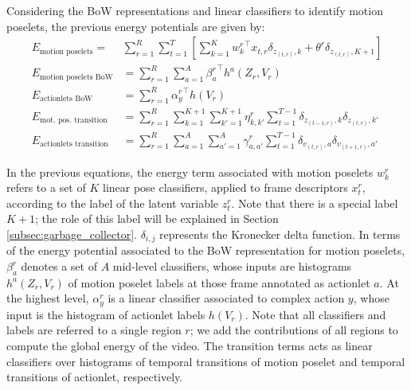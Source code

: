 Considering the BoW representations and linear classifiers to identify motion 
poselets, 
the previous energy potentials are given by:
{\small
\begin{align}
\label{eq:motionposelets}E_{\text{motion poselets}}  =  &\sum_{r=1}^R\sum_{t=1}^T  \left[ \sum_{k=1}^K {w^r_k}^\top 
x_{t,r}\delta_{z_{(t,r)},k} + \theta^r \delta_{z_{(t,r)},K+1}\right] \\
E_{\text{motion poselets BoW}} & = \sum_{r=1}^R \sum_{a=1}^A {\beta^r_{a}}^\top 
h^{a}(Z_r,V_r) \\
\label{eq:actionlets_BoW} E_{\text{actionlets BoW}} &=\sum_{r=1}^R {\alpha^r_{y}}^\top h(V_r)  \\
E_{\text{mot. pos. transition}} & = 
\sum_{r=1}^R\sum_{k=1}^{K+1}\sum_{k'=1}^{K+1} \eta^r_{k,k'} 
\sum_{t=1}^{T-1} \delta_{z_{(t-1,r)},k}\delta_{z_{(t,r)},k'}\\ 
\label{eq:actionletstransition}
E_{\text{actionlets transition}} & =\sum_{r=1}^R\sum_{a=1}^A\sum_{a'=1}^A \gamma^r_{a,a'} 
\sum_{t=1}^{T-1} 
\delta_{v_{(t,r)},a}\delta_{v_{(t+1,r)},a'} 
\end{align}
}

In the previous equations, the energy term associated with motion poselets 
$w^r_k$ refers to a set of $K$ linear pose classifiers, applied to frame 
descriptors $x_t^r$, according to the label of the latent variable $z_t^r$. 
Note that there is a special label $K+1$; the role of this label will be 
explained in Section \ref{subsec:garbage_collector}. $\delta_{i,j}$ represents 
the Kronecker delta function. In terms of the energy potential associated to 
the BoW representation for motion poselets, $\beta_a^r$ denotes a set of $A$ 
mid-level classifiers, whose inputs are histograms $h^a(Z_r,V_r)$ of motion 
poselet labels at those frame annotated as actionlet $a$. At the highest level, 
$\alpha^r_{y}$ is a linear classifier  associated to complex action $y$, whose 
input is the histogram of actionlet labels $h(V_r)$. Note that all classifiers 
and labels are referred to a single region $r$; we add the contributions of all 
regions to compute the global energy of the video. The transition terms acts as 
linear classifiers over histograms of temporal transitions of motion poselet 
and temporal transitions of actionlet, respectively.

